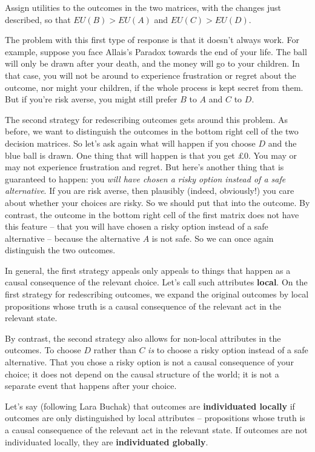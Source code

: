 \begin{exercise1}
  Assign utilities to the outcomes in the two matrices, with the
  changes just described, so that $EU(B) > EU(A)$ and $EU(C) >
  EU(D)$. 
\end{exercise1}

The problem with this first type of response is that it doesn't always
work. For example, suppose you face Allais's Paradox towards the end
of your life. The ball will only be drawn after your death, and the
money will go to your children. In that case, you will not be around
to experience frustration or regret about the outcome, nor might your
children, if the whole process is kept secret from them. But if you're
risk averse, you might still prefer $B$ to $A$ and $C$ to
$D$.

The second strategy for redescribing outcomes gets around this
problem. As before, we want to distinguish the outcomes in the bottom
right cell of the two decision matrices. So let's ask again what will
happen if you choose $D$ and the blue ball is drawn. One thing that
will happen is that you get £0. You may or may not experience
frustration and regret. But here's another thing that is guaranteed to
happen: you \emph{will have chosen a risky option instead of a safe
  alternative}. If you are risk averse, then plausibly (indeed,
obviously!) you care about whether your choices are risky. So we
should put that into the outcome. By contrast, the outcome in the
bottom right cell of the first matrix does not have this feature --
that you will have chosen a risky option instead of a safe alternative
-- because the alternative $A$ is not safe.  So we can once again
distinguish the two outcomes.

In general, the first strategy appeals only appeals to things that happen as a
causal consequence of the relevant choice. Let's call such attributes
\textbf{local}. On the first strategy for redescribing outcomes, we expand the
original outcomes by local propositions whose truth is a causal consequence of
the relevant act in the relevant state.

By contrast, the second strategy also allows for non-local attributes
in the outcomes. To choose $D$ rather than $C$ \emph{is} to choose a
risky option instead of a safe alternative. That you chose a risky
option is not a causal consequence of your choice; it does not depend
on the causal structure of the world; it is not a separate event that
happens after your choice.

Let's say (following Lara Buchak) that outcomes are
\textbf{individuated locally} if outcomes are only distinguished by
local attributes -- propositions whose truth is a causal consequence of the relevant act in the
relevant state. If outcomes are not individuated locally, they are
\textbf{individuated globally}.

